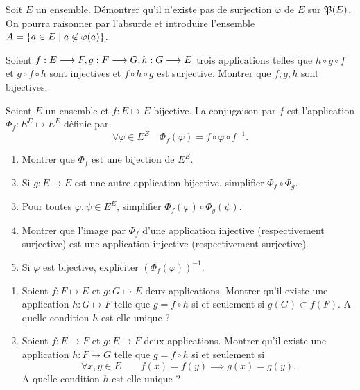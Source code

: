 \begin{exercice}
    Soit \(E\) un ensemble. Démontrer qu'il n'existe pas de surjection \(\varphi\) de \(E\) sur \(\mathfrak{P}(E)\). On pourra raisonner par l'absurde et introduire l'ensemble \(A=\left\{a \in E\mathrel{}\middle|\mathrel{}a \not\in \varphi(a)\right\}\).
\end{exercice}
\begin{exercice}
    Soient \(f:E \longrightarrow F, g:F \longrightarrow G, h:G \longrightarrow E\) trois applications telles que \(h \circ g \circ f\) et \(g \circ f \circ h\) sont injectives et \(f \circ h \circ g\) est surjective. Montrer que \(f, g, h\) sont bijectives.
\end{exercice}
\begin{exercice}[Conjugaison]
    Soient \(E\) un ensemble et \(f : E \longmapsto E\) bijective. La conjugaison par \(f\) est l'application \(\Phi_f : E^E \longmapsto E^E\) définie par
    \begin{equation}
        \forall \varphi \in E^E \quad \Phi_f(\varphi) = f \circ \varphi \circ f^{-1}.
    \end{equation}
    \begin{enumerate}
        \item Montrer que \(\Phi_f\) est une bijection de \(E^E\).
        \item Si \(g : E \longmapsto E\) est une autre application bijective, simplifier \(\Phi_f \circ \Phi_g\).
        \item Pour toutes \(\varphi, \psi \in E^E\), simplifier  \(\Phi_f(\varphi) \circ \Phi_g(\psi)\).
        \item Montrer que l'image par \(\Phi_f\) d'une application injective (respectivement surjective) est une application injective (respectivement surjective).
        \item Si \(\varphi\) est bijective, expliciter \((\Phi_f(\varphi))^{-1}\).
    \end{enumerate}
\end{exercice}
\begin{exercice}
    \begin{enumerate}
        \item Soient \(f : F \longmapsto E\) et \(g : G \longmapsto E\) deux applications. Montrer qu'il existe une application \(h : G \longmapsto F\) telle que \(g = f \circ h\) si et seulement si \(g(G) \subset f(F)\). A quelle condition \(h\) est-elle unique ?
        \item Soient \(f : E \longmapsto F\) et \(g : E \longmapsto F\) deux applications. Montrer qu'il existe une application \(h : F \longmapsto G\) telle que \(g = f \circ h\) si et seulement si 
            \begin{equation}
                \forall x,y \in E \qquad f(x)=f(y) \implies g(x)=g(y).
            \end{equation}
            A quelle condition \(h\) est elle unique ?
    \end{enumerate}
\end{exercice}
